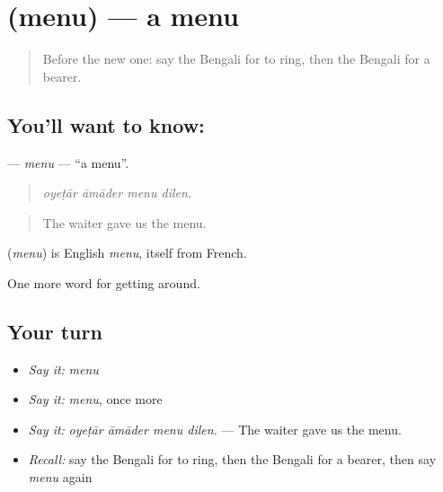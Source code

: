 \section[\texorpdfstring{\bn{মেনু} (menu)}{মেনু (menu)}]{ (menu) — a menu}

\label{lesson:BN-C407-menu}



\begin{quote}
Before the new one: say the Bengali for to ring, then the Bengali for a bearer.
\end{quote}

\subsection*{You'll want to know: }
\textbf{} — \emph{menu} — \textquotedblleft{}a menu\textquotedblright{}.

\begin{quote}
   
\end{quote}

\begin{quote}
\emph{oyeṭār āmāder menu dilen.}
\end{quote}

\begin{quote}
The waiter gave us the menu.
\end{quote}

\begin{cousinweb}
\textbf{} (\emph{menu}) is English \emph{menu}, itself from French.
\end{cousinweb}

\begin{grammarlens}[title={What you've built}]
One more word for getting around.
\end{grammarlens}

\subsection*{Your turn}
\begin{itemize}
\raggedright
  \item \emph{Say it:} \emph{menu}
  \item \emph{Say it:} \emph{menu}, once more
  \item \emph{Say it:} \emph{oyeṭār āmāder menu dilen.} — The waiter gave us the menu.
  \item \emph{Recall:} say the Bengali for to ring, then the Bengali for a bearer, then say \emph{menu} again
\end{itemize}

